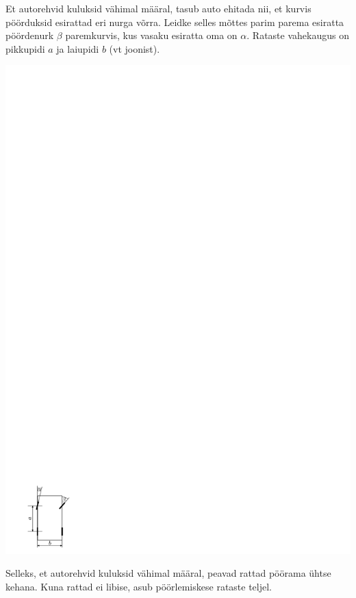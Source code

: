 
Et autorehvid kuluksid vähimal määral, tasub auto ehitada nii, et kurvis
pöörduksid esirattad eri nurga võrra. Leidke selles mõttes parim parema
esiratta pöördenurk $\beta$ paremkurvis, kus
vasaku esiratta oma on $\alpha$. Rataste vahekaugus on pikkupidi $a$ ja laiupidi
$b$ (vt joonist).
\begin{center}
\includegraphics[width=0.3\linewidth]{2012-v3g-05-r_yl_joonis}%
\end{center}

\hint
Selleks, et autorehvid kuluksid vähimal määral, peavad rattad pöörama ühtse kehana. Kuna rattad ei libise, asub pöörlemiskese rataste teljel.

